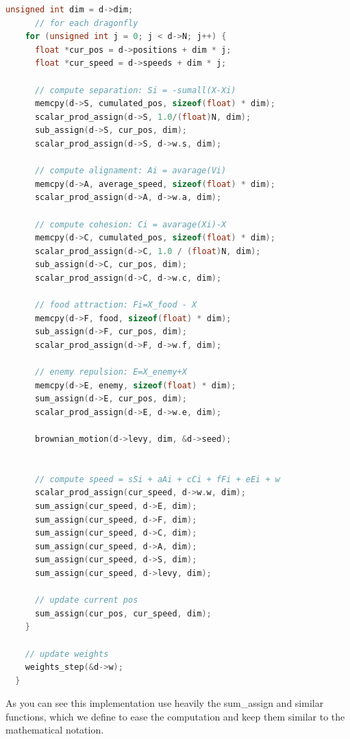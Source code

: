 \documentclass[10pt]{article}
\begin{document}
\begin{multicols}{2}
\begin{lstlisting}[language=C,caption={first implementation of the dragonfly algorithm}]
    unsigned int dim = d->dim;
      // for each dragonfly
    for (unsigned int j = 0; j < d->N; j++) {
      float *cur_pos = d->positions + dim * j;
      float *cur_speed = d->speeds + dim * j;

      // compute separation: Si = -sumall(X-Xi)
      memcpy(d->S, cumulated_pos, sizeof(float) * dim);
      scalar_prod_assign(d->S, 1.0/(float)N, dim);
      sub_assign(d->S, cur_pos, dim);
      scalar_prod_assign(d->S, d->w.s, dim);

      // compute alignament: Ai = avarage(Vi)
      memcpy(d->A, average_speed, sizeof(float) * dim);
      scalar_prod_assign(d->A, d->w.a, dim);

      // compute cohesion: Ci = avarage(Xi)-X
      memcpy(d->C, cumulated_pos, sizeof(float) * dim);
      scalar_prod_assign(d->C, 1.0 / (float)N, dim);
      sub_assign(d->C, cur_pos, dim);
      scalar_prod_assign(d->C, d->w.c, dim);

      // food attraction: Fi=X_food - X
      memcpy(d->F, food, sizeof(float) * dim);
      sub_assign(d->F, cur_pos, dim);
      scalar_prod_assign(d->F, d->w.f, dim);

      // enemy repulsion: E=X_enemy+X
      memcpy(d->E, enemy, sizeof(float) * dim);
      sum_assign(d->E, cur_pos, dim);
      scalar_prod_assign(d->E, d->w.e, dim);

      brownian_motion(d->levy, dim, &d->seed);


      // compute speed = sSi + aAi + cCi + fFi + eEi + w
      scalar_prod_assign(cur_speed, d->w.w, dim);
      sum_assign(cur_speed, d->E, dim);
      sum_assign(cur_speed, d->F, dim);
      sum_assign(cur_speed, d->C, dim);
      sum_assign(cur_speed, d->A, dim);
      sum_assign(cur_speed, d->S, dim);
      sum_assign(cur_speed, d->levy, dim);

      // update current pos
      sum_assign(cur_pos, cur_speed, dim);
    }

    // update weights
    weights_step(&d->w);
  }
\end{lstlisting}



\noindent  As you can see this implementation use heavily the sum\_assign and similar functions, which we define to ease the computation and keep them similar to the mathematical notation.


\end{multicols}
\end{document}
